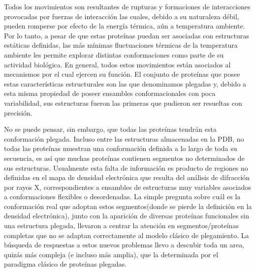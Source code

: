 Todos los movimientos son resultantes de rupturas y formaciones de interacciones provocadas por fuerzas de interacción las cuales, debido a su naturaleza débil, pueden romperse por efecto de la energía térmica, aún a temperatura ambiente.
Por lo tanto, a pesar de que estas proteínas puedan ser asociadas con estructuras estáticas definidas, las más mínimas fluctuaciones térmicas de la temperatura ambiente les permite explorar distintas conformaciones como parte de su actividad biológica.
En general, todos estos movimientos están asociados al mecanismos por el cual ejercen su función.
El conjunto de proteínas que posee estas características estructurales son las que denominamos plegadas y, debido a esta misma propiedad de poseer ensambles conformacionales con poca variabilidad, sus estructuras fueron las primeras que pudieron ser resueltas con precisión. 

No se puede pensar, sin embargo, que todas las proteínas tendrán esta conformación plegada.
Incluso entre las estructuras almacenadas en la PDB, no todas las proteínas muestran una conformación definida a lo largo de toda su secuencia, es así que muchas proteínas contienen segmentos no determinados de sus estructuras.
Usualmente esta falta de información es producto de regiones no definidas en el mapa de densidad electrónica que resulta del análisis de difracción por rayos X, 
correspondientes a ensambles de estructuras muy variables asociados a conformaciones flexibles o desordenadas. 
La simple pregunta sobre cuál es la conformación real que adoptan estos segmentos(donde se pierde la definición en la densidad electrónica), 
junto con la aparición de diversas proteínas funcionales sin una estructura plegada, 
llevaron a centrar la atención en 
segmentos/proteínas completas 
que no se adaptan correctamente al modelo clásico de plegamiento.
La búsqueda de respuestas a estos nuevos problemas llevo a descubir toda un area, quizás más compleja (e incluso más amplia), que la determinada por el paradigma clásico de proteínas plegadas.








